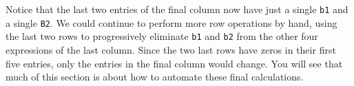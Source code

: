%
Notice that the last two entries of the final column now have just a single \verb?b1? and a single \verb?B2?. We could continue to perform more row operations by hand, using the last two rows to progressively eliminate \verb?b1? and \verb?b2? from the other four expressions of the last column.  Since the two last rows have zeros in their first five entries, only the entries in the final column would change.  You will see that much of this section is about how to automate these final calculations.
%
\begin{sageverbatim}
\end{sageverbatim}
%

